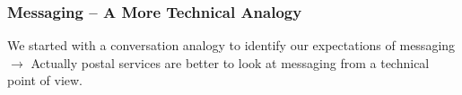 \documentclass[
	aspectratio=169,
	xetex,
]{beamer}
\begin{document}
\begin{frame}
	\frametitle{Messaging -- A More Technical Analogy}
		We started with a conversation analogy to identify our expectations of messaging\\[12pt]
		$\rightarrow$ Actually \alert{postal services} are better to look at messaging from a technical point of view.\\[24pt]
		\begin{center}
		\end{center}
\end{frame}
\end{document}
